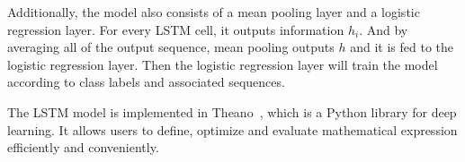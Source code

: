 Additionally, the model also consists of a mean pooling layer and a logistic regression layer. For every LSTM cell, it outputs information $h_i$. And by averaging all of the output sequence, mean pooling outputs $h$ and it is fed to the logistic regression layer. Then the logistic regression layer will train the model according to class labels and associated sequences.

The LSTM model is implemented in Theano~\cite{bastien2012, bergstra2010}, which is a Python library for deep learning. It allows users to define, optimize and evaluate mathematical expression efficiently and conveniently. 



